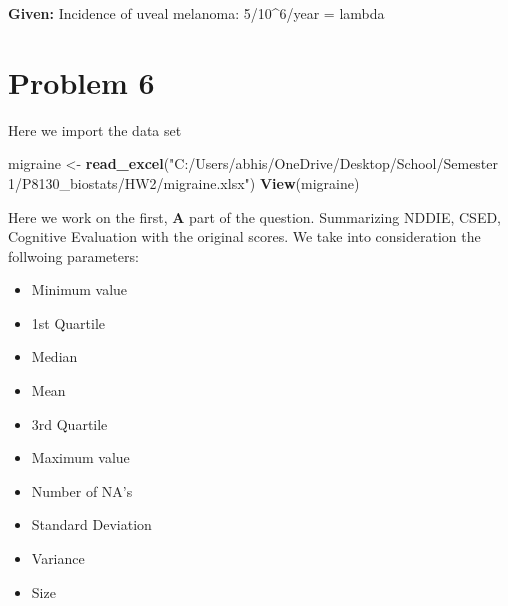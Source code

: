 \documentclass[]{article}
\newenvironment{Shaded}{\begin{snugshade}}{\end{snugshade}}
\newcommand{\KeywordTok}[1]{\textcolor[rgb]{0.13,0.29,0.53}{\textbf{#1}}}
\newcommand{\StringTok}[1]{\textcolor[rgb]{0.31,0.60,0.02}{#1}}
\newcommand{\NormalTok}[1]{#1}
\begin{document}
\textbf{Given:} Incidence of uveal melanoma: 5/10\^{}6/year = lambda

\section{Problem 6}\label{problem-6}

Here we import the data set

\begin{Shaded}
\begin{Highlighting}[]
\NormalTok{migraine <-}\StringTok{ }\KeywordTok{read_excel}\NormalTok{(}\StringTok{"C:/Users/abhis/OneDrive/Desktop/School/Semester 1/P8130_biostats/HW2/migraine.xlsx"}\NormalTok{)}
\KeywordTok{View}\NormalTok{(migraine)}
\end{Highlighting}
\end{Shaded}

Here we work on the first, \textbf{A} part of the question. Summarizing
NDDIE, CSED, Cognitive Evaluation with the original scores. We take into
consideration the follwoing parameters:

\begin{itemize}
\item
  Minimum value
\item
  1st Quartile
\item
  Median
\item
  Mean
\item
  3rd Quartile
\item
  Maximum value
\item
  Number of NA's
\item
  Standard Deviation
\item
  Variance
\item
  Size
\end{itemize}
\end{document}
